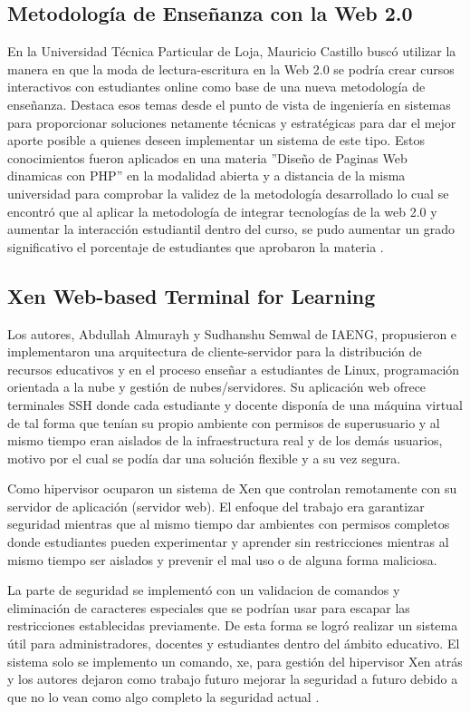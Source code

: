 \subsection{Metodología de Enseñanza con la Web 2.0}
En la Universidad Técnica Particular de Loja, Mauricio Castillo buscó utilizar la manera en que la moda de lectura-escritura en la Web 2.0 se podría crear cursos interactivos con estudiantes online como base de una nueva metodología de enseñanza. Destaca esos temas desde el punto de vista de ingeniería en sistemas para proporcionar soluciones netamente técnicas y estratégicas para dar el mejor aporte posible a quienes deseen implementar un sistema de este tipo. Estos conocimientos fueron aplicados en una materia ''Diseño de Paginas Web dinamicas con PHP'' en la modalidad abierta y a distancia de la misma universidad para comprobar la validez de la metodología desarrollado lo cual se encontró que al aplicar la metodología de integrar tecnologías de la web 2.0 y aumentar la interacción estudiantil dentro del curso, se pudo aumentar un grado significativo el porcentaje de estudiantes que aprobaron la materia \citep{UTPL-Thesis-Edu-Web-2}.

   
\subsection{Xen Web-based Terminal for Learning}
Los autores, Abdullah Almurayh y Sudhanshu Semwal de IAENG, propusieron e implementaron una arquitectura de cliente-servidor para la distribución de recursos educativos y en el proceso enseñar a estudiantes de Linux, programación orientada a la nube y gestión de nubes/servidores. Su aplicación web ofrece terminales SSH donde cada estudiante y docente disponía de una máquina virtual de tal forma que tenían su propio ambiente con permisos de superusuario y al mismo tiempo eran aislados de la infraestructura real y de los demás usuarios, motivo por el cual se podía dar una solución flexible y a su vez segura.

Como hipervisor ocuparon un sistema de Xen que controlan remotamente con su servidor de aplicación (servidor web). El enfoque del trabajo era garantizar seguridad mientras que al mismo tiempo dar ambientes con permisos completos donde estudiantes pueden experimentar y aprender sin restricciones mientras al mismo tiempo ser aislados y prevenir el mal uso o de alguna forma maliciosa.

La parte de seguridad se implementó con un validacion de comandos y eliminación de caracteres especiales que se podrían usar para escapar las restricciones establecidas previamente. De esta forma se logró realizar un sistema útil para administradores, docentes y estudiantes dentro del ámbito educativo. El sistema solo se implemento un comando, xe, para gestión del hipervisor Xen atrás y los autores dejaron como trabajo futuro mejorar la seguridad a futuro debido a que no lo vean como algo completo la seguridad actual \citep{almurayh2014xen}.
    

